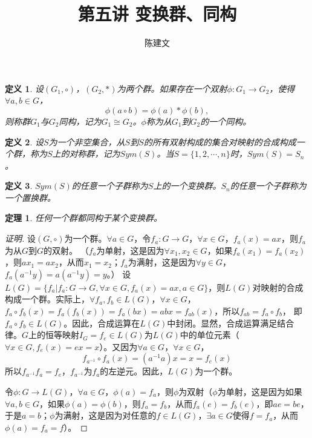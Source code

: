 \documentclass{article}
\newtheorem{Def}{定义}
\newtheorem{Thm}{定理}
\begin{document}
\begin{CJK*}{UTF8}{gbsn}
  \title{第五讲 变换群、同构}
  \author{陈建文}
  \maketitle
  \begin{Def}
    设$(G_1,\circ)$，$(G_2,*)$为两个群。如果存在一个双射$\phi:G_1\to G_2$，使得$\forall a,b\in G$，
    \[\phi(a\circ b)=\phi(a)* \phi(b),\]
    则称群$G_1$与$G_2$同构，记为$G_1\cong G_2$。$\phi$称为从$G_1$到$G_2$的一个同构。
  \end{Def}

  \begin{Def}
    设$S$为一个非空集合，从$S$到$S$的所有双射构成的集合对映射的合成构成一个群，称为$S$上的对称群，记为$Sym(S)$。当$S=\{1,2,\cdots,n\}$时，$Sym(S)=S_n$。
  \end{Def}

\begin{Def}
  $Sym(S)$的任意一个子群称为$S$上的一个变换群。$S_n$的任意一个子群称为一个置换群。
\end{Def}

\begin{Thm}
  任何一个群都同构于某个变换群。
\end{Thm}
\begin{proof}[证明]
  设$(G,\circ)$为一个群。$\forall a\in G$，令$f_a:G\to G$，$\forall x\in G$，$f_a(x)=ax$，则$f_a$为从$G$到$G$的双射。
  （$f_a$为单射，这是因为$\forall x_1,x_2\in G$，如果$f_a(x_1)=f_a(x_2)$，则$ax_1=ax_2$，从而$x_1=x_2$；$f_a$为满射，这是因为$\forall y\in G$，$f_a(a^{-1}y)=a(a^{-1}y)=y$。）
设$L(G)=\{f_a|f_a:G\to G,\forall x\in G,f_a(x)=ax,a\in G\}$，则$L(G)$对映射的合成构成一个群。实际上，$\forall f_a,f_b\in L(G)$，$\forall x\in G$，$f_a\circ f_b(x)=f_a(f_b(x))=f_a(bx)=abx=f_{ab}(x)$，所以$f_{ab}=f_a\circ f_b$，
即$f_a\circ f_b\in L(G)$。因此，合成运算在$L(G)$中封闭。显然，合成运算满足结合律。$G$上的恒等映射$I_G=f_e\in L(G)$为$L(G)$中的单位元素（$\forall x\in G,f_e(x)=ex=x$）。又因为$\forall a\in G$，$\forall x\in G$，
\[f_{a^{-1}}\circ f_a(x)=(a^{-1}a)x=x=f_e(x)\]
所以$f_{a^{-1}}f_a=f_e$，$f_{a^{-1}}$为$f_a$的左逆元。因此，$L(G)$为一个群。

令$\phi:G\to L(G)$，$\forall a\in G$，$\phi(a)=f_a$，则$\phi$为双射（$\phi$为单射，这是因为如果$\forall a,b\in G$，如果$\phi(a)=\phi(b)$，则$f_a=f_b$，从而$f_a(e)=f_b(e)$，即$ae=be$，于是$a=b$；$\phi$为满射，这是因为对任意的$f\in L(G)$，$\exists a\in G$使得$f=f_a$，从而$\phi(a)=f_a=f$）。


\end{proof}
\end{CJK*}
\end{document}
